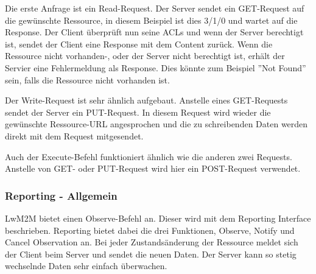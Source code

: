 Die erste Anfrage ist ein Read-Request. Der Server sendet ein GET-Request auf die gewünschte Ressource, in diesem Beispiel ist dies 3/1/0 und wartet auf die Response. Der Client überprüft nun seine ACLs und wenn der Server berechtigt ist, sendet der Client eine Response mit dem Content zurück. Wenn die Ressource nicht vorhanden-, oder der Server nicht berechtigt ist, erhält der Servier eine Fehlermeldung als Response. Dies könnte zum Beispiel ''Not Found'' sein, falls die Ressource nicht vorhanden ist.

Der Write-Request ist sehr ähnlich aufgebaut. Anstelle eines GET-Requests sendet der Server ein PUT-Request. In diesem Request wird wieder die gewünschte Ressource-URL angesprochen und die zu schreibenden Daten werden direkt mit dem Request mitgesendet.

Auch der Execute-Befehl funktioniert ähnlich wie die anderen zwei Requests. Anstelle von GET- oder PUT-Request wird hier ein POST-Request verwendet.

\subsubsection{Reporting - Allgemein}
LwM2M bietet einen Observe-Befehl an. Dieser wird mit dem Reporting Interface beschrieben. Reporting bietet dabei die drei Funktionen, Observe, Notify und Cancel Observation an. Bei jeder Zustandsänderung der Ressource meldet sich der Client beim Server und sendet die neuen Daten. Der Server kann so stetig wechselnde Daten sehr einfach überwachen.
